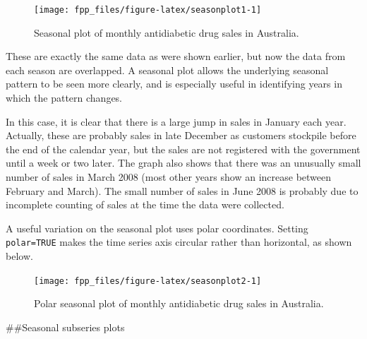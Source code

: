 \documentclass[]{book}
\newenvironment{Shaded}{\begin{snugshade}}{\end{snugshade}}
\newcommand{\DataTypeTok}[1]{\textcolor[rgb]{0.13,0.29,0.53}{#1}}
\newcommand{\KeywordTok}[1]{\textcolor[rgb]{0.13,0.29,0.53}{\textbf{#1}}}
\newcommand{\NormalTok}[1]{#1}
\newcommand{\OperatorTok}[1]{\textcolor[rgb]{0.81,0.36,0.00}{\textbf{#1}}}
\newcommand{\OtherTok}[1]{\textcolor[rgb]{0.56,0.35,0.01}{#1}}
\newcommand{\StringTok}[1]{\textcolor[rgb]{0.31,0.60,0.02}{#1}}
\begin{document}
\begin{figure}

{\centering \texttt{[image: fpp\_files/figure-latex/seasonplot1-1]} 

}

\caption{Seasonal plot of monthly antidiabetic drug sales in Australia.}\label{fig:seasonplot1}
\end{figure}

These are exactly the same data as were shown earlier, but now the data from each season are overlapped. A seasonal plot allows the underlying seasonal pattern to be seen more clearly, and is especially useful in identifying years in which the pattern changes.

In this case, it is clear that there is a large jump in sales in January each year. Actually, these are probably sales in late December as customers stockpile before the end of the calendar year, but the sales are not registered with the government until a week or two later. The graph also shows that there was an unusually small number of sales in March 2008 (most other years show an increase between February and March). The small number of sales in June 2008 is probably due to incomplete counting of sales at the time the data were collected.

A useful variation on the seasonal plot uses polar coordinates. Setting \texttt{polar=TRUE} makes the time series axis circular rather than horizontal, as shown below.

\begin{Shaded}
\end{Shaded}

\begin{figure}

{\centering \texttt{[image: fpp\_files/figure-latex/seasonplot2-1]} 

}

\caption{Polar seasonal plot of monthly antidiabetic drug sales in Australia.}\label{fig:seasonplot2}
\end{figure}

\#\#Seasonal subseries plots
\end{document}
